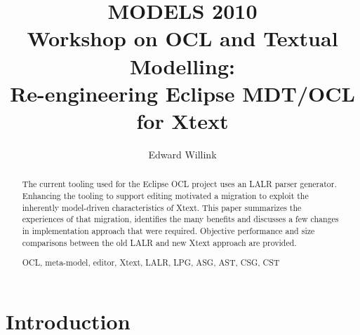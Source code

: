 \documentclass[runningheads,a4paper]{llncs}
\newcommand{\keywords}[1]{\par\addvspace\baselineskip
\noindent\keywordname\enspace\ignorespaces#1}
\begin{document}
\mainmatter  %

\title{MODELS 2010\\Workshop on OCL and Textual Modelling:\\Re-engineering Eclipse MDT/OCL for Xtext}


%
%
\author{Edward Willink}
%


%
%

\maketitle


\begin{abstract}
The current tooling used for the Eclipse OCL project uses an LALR parser generator. Enhancing the tooling to support editing motivated a migration to exploit the inherently model-driven characteristics of Xtext. This paper summarizes the experiences of that migration, identifies the many benefits and discusses a few changes in implementation approach that were required. Objective performance and size comparisons between the old LALR and new Xtext approach are provided.
\keywords{OCL, meta-model, editor, Xtext, LALR, LPG, ASG, AST, CSG, CST}
\end{abstract}


\section{Introduction}
\end{document}
